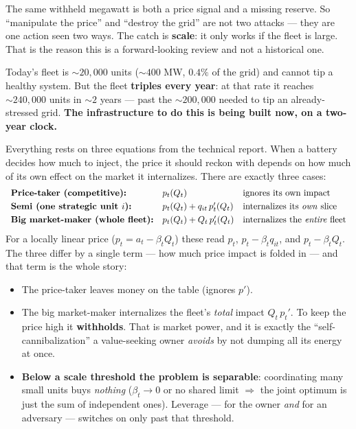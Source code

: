 \documentclass[11pt]{article}
\newcommand{\act}[2]{\vspace{6pt}\noindent{\small\bfseries\color{baseacc} #1}\;\;{\large\bfseries\color{baseblue} #2}\par\vspace{2pt}}
\begin{document}
\noindent The same withheld megawatt is both a price signal and a missing reserve.
So ``manipulate the price'' and ``destroy the grid'' are not two attacks --- they
are one action seen two ways. The catch is \textbf{scale}: it only works if the
fleet is large. That is the reason this is a forward-looking review and not a
historical one.

\begin{crit}
Today's fleet is ${\sim}20{,}000$ units (${\sim}400$ MW, $0.4\%$ of the grid) and
cannot tip a healthy system. But the fleet \textbf{triples every year}: at that
rate it reaches ${\sim}240{,}000$ units in ${\sim}2$ years --- past the
${\sim}200{,}000$ needed to tip an already-stressed grid. \textbf{The
infrastructure to do this is being built now, on a two-year clock.}
\end{crit}

\act{Act I}{The math: where leverage comes from}

Everything rests on three equations from the technical report. When a battery
decides how much to inject, the price it should reckon with depends on how much of
its own effect on the market it internalizes. There are exactly three cases:
\[
\begin{array}{lll}
\textbf{Price-taker (competitive):} & p_t(Q_t) & \text{ignores its own impact}\\[3pt]
\textbf{Semi (one strategic unit $i$):} & p_t(Q_t)+q_{it}\,p_t'(Q_t) & \text{internalizes its \emph{own} slice}\\[3pt]
\textbf{Big market-maker (whole fleet):} & p_t(Q_t)+Q_t\,p_t'(Q_t) & \text{internalizes the \emph{entire} fleet}
\end{array}
\]
For a locally linear price ($p_t=a_t-\beta_tQ_t$) these read $p_t$, $p_t-\beta_t
q_{it}$, and $p_t-\beta_t Q_t$. The three differ by a single term --- how much
price impact is folded in --- and that term is the whole story:

\begin{itemize}
\item The price-taker leaves money on the table (ignores $p'$).
\item The big market-maker internalizes the fleet's \emph{total} impact
$Q_t\,p_t'$. To keep the price high it \textbf{withholds}. That is market power,
and it is exactly the ``self-cannibalization'' a value-seeking owner \emph{avoids}
by not dumping all its energy at once.
\item \textbf{Below a scale threshold the problem is separable}: coordinating many
small units buys \emph{nothing} ($\beta_t\!\to\!0$ or no shared limit $\Rightarrow$
the joint optimum is just the sum of independent ones). Leverage --- for the owner
\emph{and} for an adversary --- switches on only past that threshold.
\end{itemize}
\end{document}
